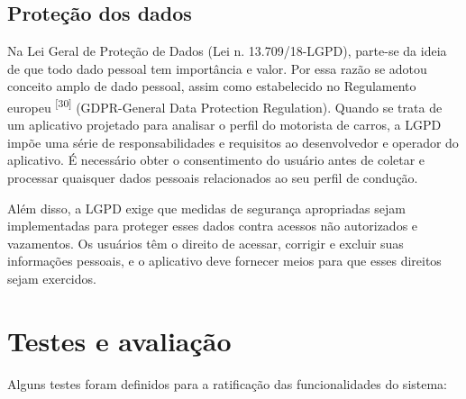     \subsection{Proteção dos dados}
    
    Na Lei Geral de Proteção de Dados (Lei n. 13.709/18-LGPD), parte-se da ideia de que todo dado pessoal tem importância e valor. Por essa razão se adotou conceito amplo de dado pessoal, assim como estabelecido no Regulamento europeu \textsuperscript{[30]} (GDPR-General Data Protection  Regulation). Quando se trata de um aplicativo projetado para analisar o perfil do motorista de carros, a LGPD impõe uma série de responsabilidades e requisitos ao desenvolvedor e operador do aplicativo. É necessário obter o consentimento  do usuário antes de coletar e processar quaisquer dados pessoais relacionados ao seu perfil de condução.
    
    Além disso, a LGPD exige que medidas de segurança apropriadas sejam implementadas para proteger esses dados contra acessos não autorizados e vazamentos. Os usuários têm o direito de acessar, corrigir e excluir suas informações pessoais, e o aplicativo deve fornecer meios para que esses direitos sejam exercidos.






\section{Testes e avaliação}
Alguns testes foram definidos para a ratificação das funcionalidades do sistema:

